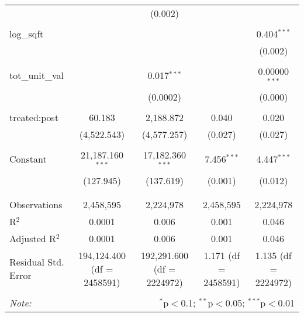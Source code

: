 \begin{table}[H]
{\begin{tabular}{@{\extracolsep{5pt}}lcccc}
   &  & (0.002) &  &  \\  

   & & & & \\  

  log\_sqft &  &  &  & 0.404$^{***}$ \\  

   &  &  &  & (0.002) \\  

   & & & & \\  

  tot\_unit\_val &  & 0.017$^{***}$ &  & 0.00000$^{***}$ \\  

   &  & (0.0002) &  & (0.000) \\  

   & & & & \\  

  treated:post & 60.183 & 2,188.872 & 0.040 & 0.020 \\  

   & (4,522.543) & (4,577.257) & (0.027) & (0.027) \\  

   & & & & \\  

  Constant & 21,187.160$^{***}$ & 17,182.360$^{***}$ & 7.456$^{***}$ & 4.447$^{***}$ \\  

   & (127.945) & (137.619) & (0.001) & (0.012) \\  

   & & & & \\  

 \hline \\[-1.8ex]  

 Observations & 2,458,595 & 2,224,978 & 2,458,595 & 2,224,978 \\  

 R$^{2}$ & 0.0001 & 0.006 & 0.001 & 0.046 \\  

 Adjusted R$^{2}$ & 0.0001 & 0.006 & 0.001 & 0.046 \\  

 Residual Std. Error & 194,124.400 (df = 2458591) & 192,291.600 (df = 2224972) & 1.171 (df = 2458591) & 1.135 (df = 2224972) \\  

 \hline  

 \hline \\[-1.8ex]  

 \textit{Note:}  & \multicolumn{4}{r}{$^{*}$p$<$0.1; $^{**}$p$<$0.05; $^{***}$p$<$0.01} \\  

 \end{tabular}}  

 \end{table}  

